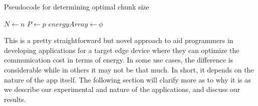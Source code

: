 \begin{algorithm}
\caption{Pseudocode for determining optimal chunk size}\label{alg:two}
$N \gets n$\;
$P \gets p$\;
$energyArray \gets \phi$\;
\end{algorithm}
This is a pretty straightforward but novel approach to aid programmers in developing applications for 
a target edge device where they can optimize the communication cost in terms of energy. In some use cases, the 
difference is considerable while in others it may not be that much. In short, it depends on the nature of the app 
itself. The following section will clarify more as to why it is as we describe our experimental and nature of the 
applications, and discuss our results. \\